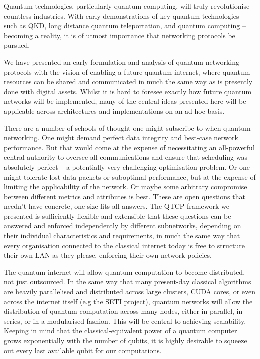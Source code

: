 \documentclass[aps,rmp,twocolumn,amsmath,amssymb,nofootinbib,superscriptaddress]{revtex4}
\begin{document}
Quantum technologies, particularly quantum computing, will truly revolutionise countless industries. With early demonstrations of key quantum technologies -- such as QKD, long distance quantum teleportation, and quantum computing -- becoming a reality, it is of utmost importance that networking protocols be pursued.

We have presented an early formulation and analysis of quantum networking protocols with the vision of enabling a future quantum internet, where quantum resources can be shared and communicated in much the same way as is presently done with digital assets. Whilst it is hard to foresee exactly how future quantum networks will be implemented, many of the central ideas presented here will be applicable across architectures and implementations on an ad hoc basis.

There are a number of schools of thought one might subscribe to when quantum networking. One might demand perfect data integrity and best-case network performance. But that would come at the expense of necessitating an all-powerful central authority to oversee all communications and ensure that scheduling was absolutely perfect -- a potentially very challenging optimisation problem. Or one might tolerate lost data packets or suboptimal performance, but at the expense of limiting the applicability of the network. Or maybe some arbitrary compromise between different metrics and attributes is best. These are open questions that needn't have concrete, one-size-fits-all answers. The QTCP framework we presented is sufficiently flexible and extensible that these questions can be answered and enforced independently by different subnetworks, depending on their individual characteristics and requirements, in much the same way that every organisation connected to the classical internet today is free to structure their own LAN as they please, enforcing their own network policies.

The quantum internet will allow quantum computation to become distributed, not just outsourced. In the same way that many present-day classical algorithms are heavily parallelised and distributed across large clusters, CUDA cores, or even across the internet itself (e.g the SETI project), quantum networks will allow the distribution of quantum computation across many nodes, either in parallel, in series, or in a modularised fashion. This will be central to achieving scalability. Keeping in mind that the classical-equivalent power of a quantum computer grows exponentially with the number of qubits, it is highly desirable to squeeze out every last available qubit for our computations.
\end{document}
